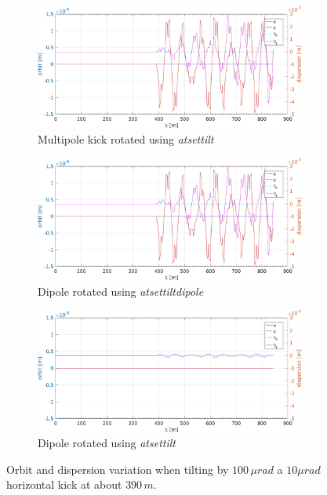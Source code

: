 \begin{figure}[!thb]
	\centering
	\begin{subfigure}[b]{\textwidth}
        \includegraphics[width=0.98\textwidth]{./images/TILT/OrbitDispCorTiltVar.jpg}
	\caption{Multipole kick rotated using \emph{atsettilt}}
        \label{fig:multtilt}
    \end{subfigure}
		
	\begin{subfigure}[b]{\textwidth}
        \includegraphics[width=0.98\textwidth]{./images/TILT/OrbitDispDipTiltVar.jpg}
	\caption{Dipole rotated using \emph{atsettiltdipole}}
        \label{fig:diptilt}
    \end{subfigure}
	
	\begin{subfigure}[b]{\textwidth}
        \includegraphics[width=0.98\textwidth]{./images/TILT/OrbitDispDipTiltVarRef.jpg}
	\caption{Dipole rotated using \emph{atsettilt}}
        \label{fig:diptiltref}
    \end{subfigure}
	\caption{Orbit and dispersion variation when tilting by $100\, \mu rad$ a $10 \mu rad$ horizontal kick at about $390\,m$.}
	\label{fig:rotdipvscor}
\end{figure}

